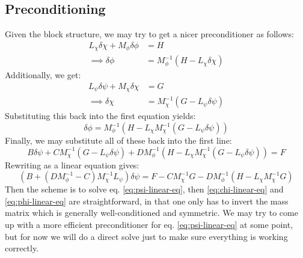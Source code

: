 \documentclass[reqno]{article}
\begin{document}
\subsection{Preconditioning}
Given the block structure, we may try to get a nicer preconditioner as follows:
\begin{equation} \label{eq:phi-linear-eq}
    \begin{split}
        L_\chi \delta \chi + M_\phi \delta \phi &= H \\
        \implies \delta \phi &= M_\phi^{-1} \left( H - L_\chi \delta \chi \right)
    \end{split}
\end{equation}
Additionally, we get:
\begin{equation} \label{eq:chi-linear-eq}
    \begin{split}
        L_\psi \delta \psi + M_\chi \delta \chi &= G \\
        \implies \delta \chi &= M_\chi^{-1} \left( G - L_\psi \delta \psi \right)
    \end{split}
\end{equation}
Substituting this back into the first equation yields:
\begin{equation}
    \delta \phi
    =
    M_\phi^{-1} \left( H - L_\chi M_\chi^{-1} \left(G - L_\psi \delta \psi \right) \right)
\end{equation}
Finally, we may substitute all of these back into the first line:
\begin{equation}
    B \delta \psi 
    + C M_\chi^{-1} \left(G - L_\psi \delta \psi \right)
    + D M_\phi^{-1} \left(H - L_\chi M_\chi^{-1} \left(G - L_\psi \delta \psi \right) \right)
    =
    F
\end{equation}
Rewriting as a linear equation gives:
\begin{equation} \label{eq:psi-linear-eq}
    \left(B + \left( D M_\phi^{-1} - C \right) M_\chi^{-1} L_\psi \right) \delta \psi
    =
    F - C M_\chi^{-1} G - D M_\phi^{-1} \left( H - L_\chi M_\chi^{-1} G \right)
\end{equation}
Then the scheme is to solve eq. \eqref{eq:psi-linear-eq}, then \eqref{eq:chi-linear-eq} and \eqref{eq:phi-linear-eq} are straightforward, in that one only has to invert the mass matrix which is generally well-conditioned and symmetric.
We may try to come up with a more efficient preconditioner for eq. \eqref{eq:psi-linear-eq} at some point, but for now we will do a direct solve just to make sure everything is working correctly.
\end{document}
